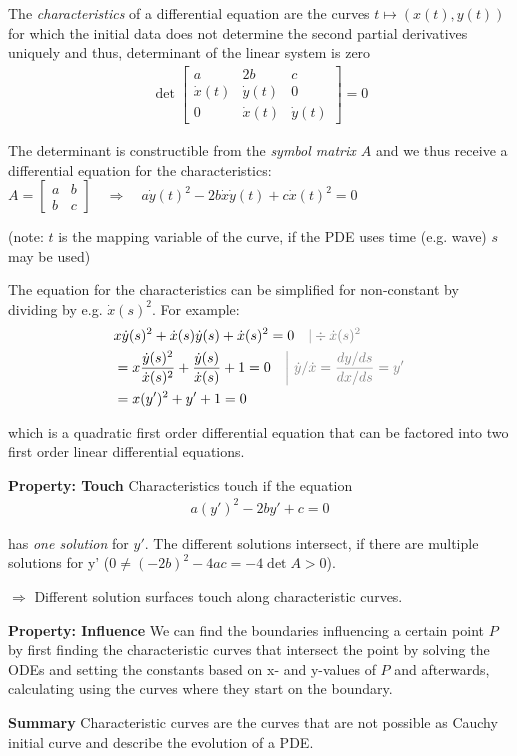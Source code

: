The \emph{characteristics} of a differential equation are the curves $t\mapsto(x(t),y(t))$ for which the initial data
does not determine the second partial derivatives uniquely and thus, determinant of the linear system is zero
\begin{align*}
    \det
    \begin{bmatrix}
        a & 2b & c \\
        \dot{x}(t) & \dot{y}(t) & 0 \\
        0 & \dot{x}(t) & \dot{y}(t)
    \end{bmatrix}
    = 0
\end{align*}

The determinant is constructible from the \emph{symbol matrix $A$} and we thus receive a differential equation for the characteristics:
\colorbox{shadecolor}{$
    \displaystyle
    A = \begin{bmatrix}
        a & b \\
        b & c
    \end{bmatrix}
    \quad\Rightarrow\quad
    a\dot{y}(t)^2 - 2b\dot{x}\dot{y}(t) + c\dot{x}(t)^2 = 0
$}

(note: $t$ is the mapping variable of the curve, if the PDE uses time (e.g. wave) $s$ may be used)

The equation for the characteristics can be simplified for non-constant by dividing by e.g. $\dot{x}(s)^2$. For example:
\begin{align*}
    & x\dot{y}(s)^{2}+\dot{x}(s)\dot{y}(s)+\dot{x}(s)^{2}=0\quad{\color{gray}|\div \dot{x}(s)^2} \\
    & = x\frac{\dot{y}(s)^{2}}{\dot{x}(s)^{2}}+\frac{\dot{y}(s)}{\dot{x}(s)}+1=0
    \quad {\color{gray} \left|\ \dot{y}/\dot{x} = \frac{dy/ds}{dx/ds} = y' \right.} \\
    & = x(y')^2 + y' + 1 = 0
\end{align*}

which is a quadratic first order differential equation that can be factored into two first order linear differential equations.

\textbf{Property: Touch} Characteristics touch if the equation
\begin{align*}
    a(y')^2 - 2by' + c = 0
\end{align*}

has \emph{one solution} for $y'$. The different solutions intersect, if there are multiple solutions for y'
($0\neq (-2b)^2-4ac = -4\det A > 0$).

$\Rightarrow$ Different solution surfaces touch along characteristic curves.

\textbf{Property: Influence} We can find the boundaries influencing a certain point $P$ by first finding the
characteristic curves that intersect the point by solving the ODEs and setting the constants based on x- and y-values of
$P$ and afterwards, calculating using the curves where they start on the boundary.

\textbf{Summary} Characteristic curves are the curves that are not possible as Cauchy initial curve and describe the
evolution of a PDE.
